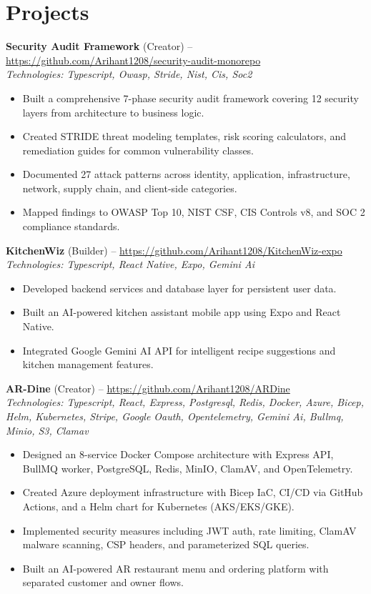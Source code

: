 \documentclass[11pt,a4paper]{article}
\begin{document}
\section{Projects}
\textbf{Security Audit Framework} (Creator) -- \href{https://github.com/Arihant1208/security-audit-monorepo}{https://github.com/Arihant1208/security-audit-monorepo}
\\ \textit{Technologies: Typescript, Owasp, Stride, Nist, Cis, Soc2}
\begin{itemize}
  \item Built a comprehensive 7-phase security audit framework covering 12 security layers from architecture to business logic.
  \item Created STRIDE threat modeling templates, risk scoring calculators, and remediation guides for common vulnerability classes.
  \item Documented 27 attack patterns across identity, application, infrastructure, network, supply chain, and client-side categories.
  \item Mapped findings to OWASP Top 10, NIST CSF, CIS Controls v8, and SOC 2 compliance standards.
\end{itemize}
\vspace{2pt}
\textbf{KitchenWiz} (Builder) -- \href{https://github.com/Arihant1208/KitchenWiz-expo}{https://github.com/Arihant1208/KitchenWiz-expo}
\\ \textit{Technologies: Typescript, React Native, Expo, Gemini Ai}
\begin{itemize}
  \item Developed backend services and database layer for persistent user data.
  \item Built an AI-powered kitchen assistant mobile app using Expo and React Native.
  \item Integrated Google Gemini AI API for intelligent recipe suggestions and kitchen management features.
\end{itemize}
\vspace{2pt}
\textbf{AR-Dine} (Creator) -- \href{https://github.com/Arihant1208/ARDine}{https://github.com/Arihant1208/ARDine}
\\ \textit{Technologies: Typescript, React, Express, Postgresql, Redis, Docker, Azure, Bicep, Helm, Kubernetes, Stripe, Google Oauth, Opentelemetry, Gemini Ai, Bullmq, Minio, S3, Clamav}
\begin{itemize}
  \item Designed an 8-service Docker Compose architecture with Express API, BullMQ worker, PostgreSQL, Redis, MinIO, ClamAV, and OpenTelemetry.
  \item Created Azure deployment infrastructure with Bicep IaC, CI/CD via GitHub Actions, and a Helm chart for Kubernetes (AKS/EKS/GKE).
  \item Implemented security measures including JWT auth, rate limiting, ClamAV malware scanning, CSP headers, and parameterized SQL queries.
  \item Built an AI-powered AR restaurant menu and ordering platform with separated customer and owner flows.
\end{itemize}
\vspace{2pt}
\end{document}
